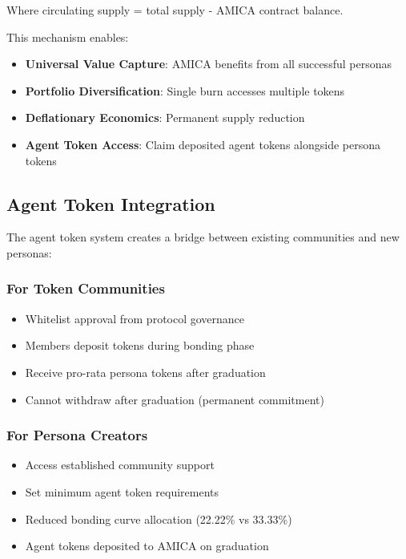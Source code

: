 \documentclass{article}
\begin{document}
Where circulating supply = total supply - AMICA contract balance.

This mechanism enables:
\begin{itemize}
    \item \textbf{Universal Value Capture}: AMICA benefits from all successful personas
    \item \textbf{Portfolio Diversification}: Single burn accesses multiple tokens
    \item \textbf{Deflationary Economics}: Permanent supply reduction
    \item \textbf{Agent Token Access}: Claim deposited agent tokens alongside persona tokens
\end{itemize}

\subsection{Agent Token Integration}

The agent token system creates a bridge between existing communities and new personas:

\subsubsection{For Token Communities}
\begin{itemize}
    \item Whitelist approval from protocol governance
    \item Members deposit tokens during bonding phase
    \item Receive pro-rata persona tokens after graduation
    \item Cannot withdraw after graduation (permanent commitment)
\end{itemize}

\subsubsection{For Persona Creators}
\begin{itemize}
    \item Access established community support
    \item Set minimum agent token requirements
    \item Reduced bonding curve allocation (22.22\% vs 33.33\%)
    \item Agent tokens deposited to AMICA on graduation
\end{itemize}
\end{document}
